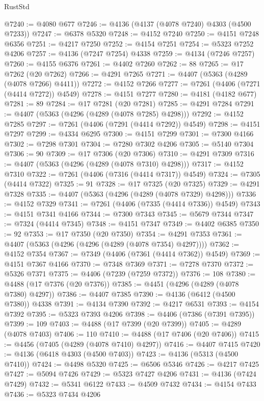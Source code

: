 \begin{lexlean}{RustStd}
\begin{coremodule}
@7240 := @4080 @677
@7246 := @4136 (@4137 (@4078 @7240) @4303 (@4500 @7233))
@7247 := @6378 @5320
@7248 := @4152 @7240
@7250 := @4151 @7248 @6356
@7251 := @4217 @7250
@7252 := @4154 @7251
@7254 := @5323 @7252 @4206
@7257 := @4136 (@7247 @7254) @4338
@7259 := @4134 (@7246 @7257)
@7260 := @4155 @6376
@7261 := @4402 @7260
@7262 := 88
@7265 := @17 @7262 (@20 @7262)
@7266 := @4291 @7265
@7271 := @4407 (@5363 (@4289 (@4078 @7266) @4411))
@7272 := @4152 @7266
@7277 := @7261 (@4406 (@7271 (@4414 @7272)) @4549)
@7278 := @4151 @7277
@7280 := @4181 (@4182 @677)
@7281 := 89
@7284 := @17 @7281 (@20 @7281)
@7285 := @4291 @7284
@7291 := @4407 (@5363 (@4296 (@4289 (@4078 @7285) @4298)))
@7292 := @4152 @7285
@7297 := @7261 (@4406 (@7291 (@4414 @7292)) @4549)
@7298 := @4151 @7297
@7299 := @4334 @6295
@7300 := @4151 @7299
@7301 := @7300 @4166
@7302 := @7298 @7301
@7304 := @7280 @7302 @4206
@7305 := @5140 @7304
@7306 := 90
@7309 := @17 @7306 (@20 @7306)
@7310 := @4291 @7309
@7316 := @4407 (@5363 (@4296 (@4289 (@4078 @7310) @4298)))
@7317 := @4152 @7310
@7322 := @7261 (@4406 (@7316 (@4414 @7317)) @4549)
@7324 := @7305 (@4414 @7322)
@7325 := 91
@7328 := @17 @7325 (@20 @7325)
@7329 := @4291 @7328
@7335 := @4407 (@5363 (@4296 (@4289 (@4078 @7329) @4298)))
@7336 := @4152 @7329
@7341 := @7261 (@4406 (@7335 (@4414 @7336)) @4549)
@7343 := @4151 @7341 @4166
@7344 := @7300 @7343
@7345 := @5679 @7344
@7347 := @7324 (@4414 @7345)
@7348 := @4151 @7347
@7349 := @4402 @6385
@7350 := 92
@7353 := @17 @7350 (@20 @7350)
@7354 := @4291 @7353
@7361 := @4407 (@5363 (@4296 (@4296 (@4289 (@4078 @7354) @4297))))
@7362 := @4152 @7354
@7367 := @7349 (@4406 (@7361 (@4414 @7362)) @4549)
@7369 := @4151 @7367 @4166
@7370 := @7348 @7369
@7371 := @7278 @7370
@7372 := @5326 @7371
@7375 := @4406 (@7239 (@7259 @7372))
@7376 := 108
@7380 := @4488 (@17 @7376 (@20 @7376))
@7385 := @4451 (@4296 (@4289 (@4078 @7380) @4297))
@7386 := @4407 @7385
@7390 := @4136 (@6412 (@4500 @7380)) @4338
@7391 := @4134 @7390
@7392 := @4217 @6531
@7393 := @4154 @7392
@7395 := @5323 @7393 @4206
@7398 := @4406 (@7386 (@7391 @7395))
@7399 := 109
@7403 := @4488 (@17 @7399 (@20 @7399))
@7405 := @4289 (@4078 @7403)
@7406 := 110
@7410 := @4488 (@17 @7406 (@20 @7406))
@7415 := @4456 (@7405 (@4289 (@4078 @7410) @4297))
@7416 := @4407 @7415
@7420 := @4136 (@6418 @4303 (@4500 @7403))
@7423 := @4136 (@5313 (@4500 @7410))
@7424 := @4498 @5320
@7425 := @6506 @5346
@7426 := @4217 @7425
@7427 := @5094 @7426
@7429 := @5323 @7427 @4206
@7431 := @4136 (@7424 @7429)
@7432 := @5341 @6122
@7433 := @4509 @7432
@7434 := @4154 @7433
@7436 := @5323 @7434 @4206

\end{coremodule}
\end{lexlean}
